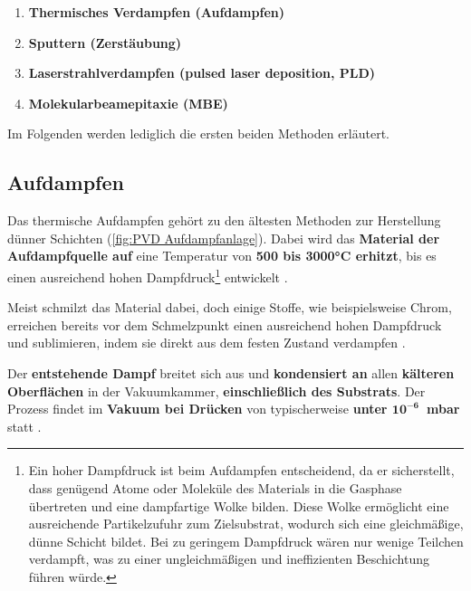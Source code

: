 \documentclass{article} %
\begin{document}
\begin{enumerate}
    \item \textbf{Thermisches Verdampfen (Aufdampfen)}
    \item \textbf{Sputtern (Zerstäubung)}
    \item \textbf{Laserstrahlverdampfen (pulsed laser deposition, PLD)}
    \item \textbf{Molekularbeamepitaxie (MBE)}
\end{enumerate}

Im Folgenden werden lediglich die ersten beiden Methoden erläutert.

\vspace{1em}
\subsection{Aufdampfen} %
Das thermische Aufdampfen gehört zu den ältesten Methoden zur Herstellung dünner Schichten (\autoref{fig:PVD Aufdampfanlage}). Dabei wird das 
\textbf{Material der Aufdampfquelle auf} eine Temperatur von \textbf{500 bis 3000°C erhitzt}, bis es einen ausreichend hohen 
Dampfdruck\footnote{Ein hoher Dampfdruck ist beim Aufdampfen entscheidend, da er sicherstellt, dass genügend Atome oder Moleküle des Materials 
in die Gasphase übertreten und eine dampfartige Wolke bilden. Diese Wolke ermöglicht eine ausreichende Partikelzufuhr zum Zielsubstrat, wodurch 
sich eine gleichmäßige, dünne Schicht bildet. Bei zu geringem Dampfdruck wären nur wenige Teilchen verdampft, was zu einer ungleichmäßigen und 
ineffizienten Beschichtung führen würde.} entwickelt \cite{keplinger2024}.

\vspace{1em}

Meist schmilzt das Material dabei, doch einige Stoffe, wie beispielsweise Chrom, erreichen bereits vor dem Schmelzpunkt einen ausreichend hohen 
Dampfdruck und sublimieren, indem sie direkt aus dem festen Zustand verdampfen \cite{keplinger2024}.

\vspace{1em}

Der \textbf{entstehende Dampf} breitet sich aus und \textbf{kondensiert an} allen \textbf{kälteren Oberflächen} in der Vakuumkammer, 
\textbf{einschließlich des Substrats}. Der Prozess findet im \textbf{Vakuum bei Drücken} von typischerweise 
\textbf{unter $\mathbf{10^{-6}}$~mbar} statt \cite{keplinger2024}.

\vspace{1em}
\end{document}
